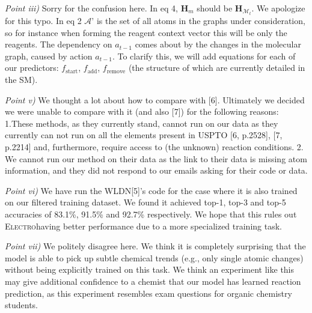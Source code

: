 \documentclass{article}
\newcommand{\ourModel}{\textsc{Electro}}
\begin{document}

\emph{Point iii)} 
Sorry for the confusion here. In eq 4, $\bm{H}_m$ should be $\bm{H}_{\mathcal{M}_t}$. We apologize for this typo.
In eq 2 $\mathcal{A}’$ is the set of all atoms in the graphs under consideration, so for instance when forming the reagent context vector this will be only the reagents.
The dependency on $a_{t-1}$ comes about by the changes in the molecular graph, caused by action $a_{t-1}$. 
To clarify this, we will add equations for each of our predictors: $f_\textrm{start}$, $f_\textrm{add}$, $f_\textrm{remove}$ (the structure of which are currently detailed in the SM).

\emph{Point v)} 
We thought a lot about how to compare with [6].
 Ultimately we decided we were unable to compare with it (and also [7]) for the following reasons:
  1.These methods, as they currently stand, cannot run on our data as they currently can not run on all the elements present in USPTO [6, p.2528], [7, p.2214] and, furthermore, require access to (the unknown) reaction conditions. 
 2. We cannot run our method on their data as the link to their data is missing atom information, and they did not respond to our emails asking for their code or data. 

\emph{Point vi)} We have run the WLDN[5]'s code for the case where it is also trained on our filtered training dataset.
 We found it achieved top-1, top-3 and top-5 accuracies of 83.1\%, 91.5\% and 92.7\% respectively. 
 We hope that this rules out \ourModel having better performance due to a more specialized training task.
  
\emph{Point vii)}
 We politely disagree here.
  We think it is completely surprising that the model is able to pick up subtle chemical trends (e.g., only single atomic changes) without being explicitly trained on this task.
   We think an experiment like this may give additional confidence to a chemist that our model has learned reaction prediction, as this experiment resembles exam questions for organic chemistry students. 
 
\end{document}
